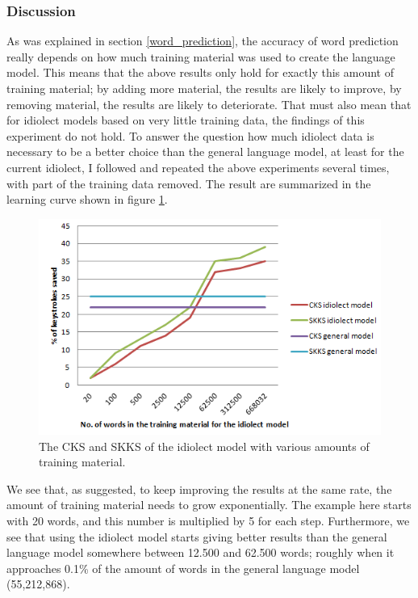 \documentclass[12pt]{article}
\begin{document}
\subsubsection{Discussion}
As was explained in section \ref{word_prediction}, the accuracy of word prediction really depends on how much training material was used to create the language model. This means that the above results only hold for exactly this amount of training material; by adding more material, the results are likely to improve, by removing material, the results are likely to deteriorate. That must also mean that for idiolect models based on very little training data, the findings of this experiment do not hold. To answer the question how much idiolect data is necessary to be a better choice than the general language model, at least for the current idiolect, I followed  and repeated the above experiments several times, with part of the training data removed. The result are summarized in the learning curve shown in figure \ref{lcurve}.

\begin{figure}[H] \centering
\includegraphics[scale=1]{lcurve}
\caption{The CKS and SKKS of the idiolect model with various amounts of training material.}
\label{lcurve}
\end{figure} 

We see that, as  suggested, to keep improving the results at the same rate, the amount of training material needs to grow exponentially. The example here starts with 20 words, and this number is multiplied by 5 for each step. Furthermore, we see that using the idiolect model starts giving better results  than the general language model somewhere between 12.500 and 62.500 words; roughly when it approaches 0.1\% of the amount of words in the general language model (55,212,868).
\end{document}
